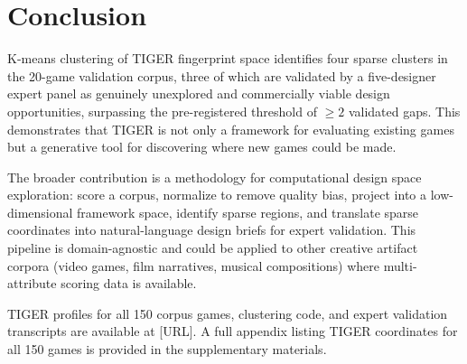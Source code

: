 \section{Conclusion}
\label{sec:conclusion}

K-means clustering of TIGER fingerprint space identifies four sparse clusters in
the 20-game validation corpus, three of which are validated by a five-designer expert
panel as genuinely unexplored and commercially viable design opportunities, surpassing
the pre-registered threshold of $\geq 2$ validated gaps. This demonstrates that TIGER is not only a framework for evaluating
existing games but a generative tool for discovering where new games could be made.

The broader contribution is a methodology for computational design space exploration:
score a corpus, normalize to remove quality bias, project into a low-dimensional
framework space, identify sparse regions, and translate sparse coordinates into
natural-language design briefs for expert validation. This pipeline is domain-agnostic
and could be applied to other creative artifact corpora (video games, film narratives,
musical compositions) where multi-attribute scoring data is available.

TIGER profiles for all 150 corpus games, clustering code, and expert validation
transcripts are available at [URL]. A full appendix listing TIGER coordinates for
all 150 games is provided in the supplementary materials.
